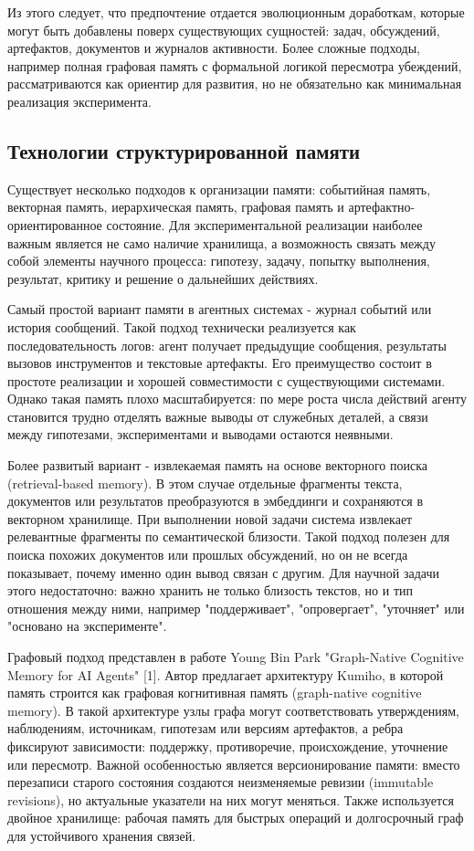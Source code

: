 Из этого следует, что предпочтение отдается эволюционным доработкам, которые могут быть добавлены поверх существующих сущностей: задач, обсуждений, артефактов, документов и журналов активности. Более сложные подходы, например полная графовая память с формальной логикой пересмотра убеждений, рассматриваются как ориентир для развития, но не обязательно как минимальная реализация эксперимента.

\subsection{Технологии структурированной памяти}

Существует несколько подходов к организации памяти: событийная память, векторная память, иерархическая память, графовая память и артефактно-ориентированное состояние. Для экспериментальной реализации наиболее важным является не само наличие хранилища, а возможность связать между собой элементы научного процесса: гипотезу, задачу, попытку выполнения, результат, критику и решение о дальнейших действиях.

Самый простой вариант памяти в агентных системах - журнал событий или история сообщений. Такой подход технически реализуется как последовательность логов: агент получает предыдущие сообщения, результаты вызовов инструментов и текстовые артефакты. Его преимущество состоит в простоте реализации и хорошей совместимости с существующими системами. Однако такая память плохо масштабируется: по мере роста числа действий агенту становится трудно отделять важные выводы от служебных деталей, а связи между гипотезами, экспериментами и выводами остаются неявными.

Более развитый вариант - извлекаемая память на основе векторного поиска (retrieval-based memory). В этом случае отдельные фрагменты текста, документов или результатов преобразуются в эмбеддинги и сохраняются в векторном хранилище. При выполнении новой задачи система извлекает релевантные фрагменты по семантической близости. Такой подход полезен для поиска похожих документов или прошлых обсуждений, но он не всегда показывает, почему именно один вывод связан с другим. Для научной задачи этого недостаточно: важно хранить не только близость текстов, но и тип отношения между ними, например "поддерживает", "опровергает", "уточняет" или "основано на эксперименте".

Графовый подход представлен в работе Young Bin Park "Graph-Native Cognitive Memory for AI Agents" [1]. Автор предлагает архитектуру Kumiho, в которой память строится как графовая когнитивная память (graph-native cognitive memory). В такой архитектуре узлы графа могут соответствовать утверждениям, наблюдениям, источникам, гипотезам или версиям артефактов, а ребра фиксируют зависимости: поддержку, противоречие, происхождение, уточнение или пересмотр. Важной особенностью является версионирование памяти: вместо перезаписи старого состояния создаются неизменяемые ревизии (immutable revisions), но актуальные указатели на них могут меняться. Также используется двойное хранилище: рабочая память для быстрых операций и долгосрочный граф для устойчивого хранения связей.

